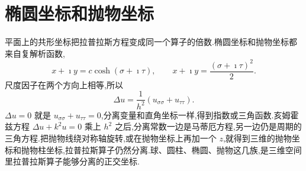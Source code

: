 \section{椭圆坐标和抛物坐标}
平面上的共形坐标把拉普拉斯方程变成同一个算子的倍数.椭圆坐标和抛物坐标都来自复解析函数,
\begin{equation}
  x+\imath y=c\cosh(\sigma+\imath\tau),
  \qquad
  x+\imath y=\frac{(\sigma+\imath\tau)^2}{2}.
\end{equation}
尺度因子在两个方向上相等,所以
\begin{equation}
  \Delta u=\frac{1}{h^2}(u_{\sigma\sigma}+u_{\tau\tau}).
\end{equation}
$\Delta u=0$ 就是 $u_{\sigma\sigma}+u_{\tau\tau}=0$,分离变量和直角坐标一样,得到指数或三角函数.亥姆霍兹方程 $\Delta u+k^2 u=0$ 乘上 $h^2$ 之后,分离常数一边是马蒂厄方程,另一边仍是周期的三角方程.把抛物线绕对称轴旋转,或在抛物坐标上再加一个 $z$,就得到三维的抛物坐标和抛物柱坐标,拉普拉斯算子仍然分离.球、圆柱、椭圆、抛物这几族,是三维空间里拉普拉斯算子能够分离的正交坐标.
